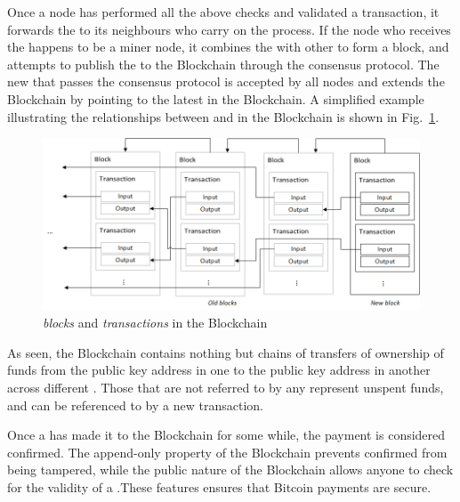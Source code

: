 Once a node has performed all the above checks and validated a transaction, it forwards the \kwTransaction{}{} to its neighbours who carry on the process. If the node who receives the \kwTransaction{}{} happens to be a miner node, it combines the \kwTransaction{}{} with other  to form a block, and attempts to publish the \kwBlock{} to the Blockchain through the consensus protocol. The new \kwBlock{} that passes the consensus protocol is accepted by all nodes and extends the Blockchain by pointing to the latest \kwBlock{} in the Blockchain. A simplified example illustrating the relationships between  and  in the Blockchain is shown in Fig.~\ref{fig:bitcoin_blockchain}.

\begin{figure}[H]
	\begin{center}
		\includegraphics[scale=0.65]{bitcoin-blockchain} 
		\caption{\textit{blocks} and \textit{transactions} in the Blockchain}
		\label{fig:bitcoin_blockchain} 
	\end{center}
\end{figure}

As seen, the Blockchain contains nothing but chains of transfers of ownership of funds from the public key address in one \kwOutput{} to the public key address in another \kwOutput{} across different . Those  that are not referred to by any \kwInput{} represent unspent funds, and can be referenced to by a new transaction.

Once a \kwTransaction{}{} has made it to the Blockchain for some while, the payment is considered confirmed.  The append-only property of the Blockchain prevents confirmed \kwTransaction{}{} from being tampered, while the public nature of the Blockchain allows anyone to check for the validity of a \kwTransaction{}{}.These features ensures that Bitcoin payments are secure. 

